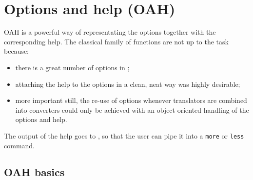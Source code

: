 

\chapter{Options and help (OAH)}

OAH is a powerful way of representating the options together with the corresponding help. The classical  family of functions are not up to the task because:
\begin{itemize}
\item there is a great number of options in \mf;
\item attaching the help to the options in a clean, neat way was highly desirable;
\item more important still, the re-use of options whenever translators are combined into converters could only be achieved with an object oriented handling of the options and help.
\end{itemize}

The output of the help  goes to \standardOutput, so that the user can pipe it into a {\tt more} or {\tt less} command.


\section{OAH basics}

